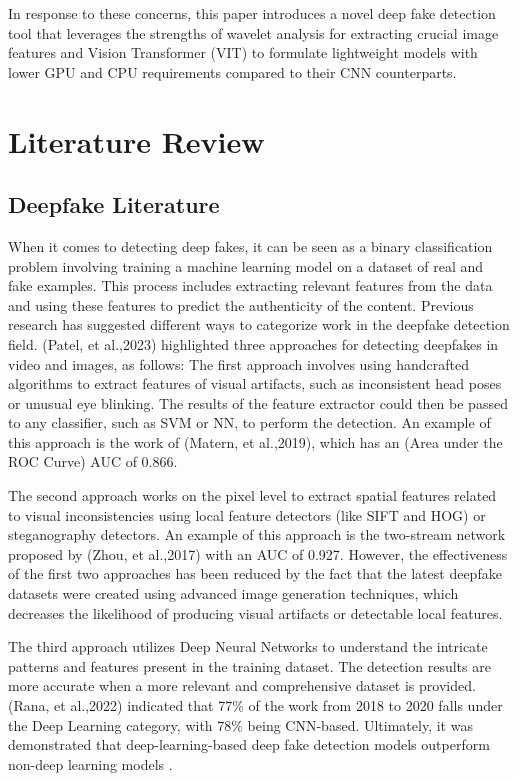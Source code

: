\documentclass{svproc}
\begin{document}
In response to these concerns, this paper introduces a novel deep fake detection tool that leverages the strengths of wavelet analysis for extracting crucial image features and Vision Transformer (VIT) to formulate lightweight models with lower GPU and CPU requirements compared to their CNN counterparts.

\section{Literature Review}
\subsection{Deepfake Literature}
When it comes to detecting deep fakes, it can be seen as a binary classification problem involving training a machine learning model on a dataset of real and fake examples\cite {patel2023deepfake}. This process includes extracting relevant features from the data and using these features to predict the authenticity of the content. Previous research has suggested different ways to categorize work in the deepfake detection field. (Patel, et al.,2023)\cite {patel2023deepfake} highlighted three approaches for detecting deepfakes in video and images, as follows: The first approach involves using handcrafted algorithms to extract features of visual artifacts, such as inconsistent head poses or unusual eye blinking. The results of the feature extractor could then be passed to any classifier, such as SVM or NN, to perform the detection. An example of this approach is the work of (Matern, et al.,2019), which has an (Area under the ROC Curve) AUC of 0.866\cite {matern2019exploiting}.

The second approach works on the pixel level to extract spatial features related to visual inconsistencies using local feature detectors (like SIFT and HOG) or steganography detectors. An example of this approach is the two-stream network proposed by (Zhou, et al.,2017) with an AUC of 0.927\cite {zhou2017two}. However, the effectiveness of the first two approaches has been reduced by the fact that the latest deepfake datasets were created using advanced image generation techniques, which decreases the likelihood of producing visual artifacts or detectable local features.

The third approach utilizes Deep Neural Networks to understand the intricate patterns and features present in the training dataset. The detection results are more accurate when a more relevant and comprehensive dataset is provided. (Rana, et al.,2022) indicated that 77\% of the work from 2018 to 2020 falls under the Deep Learning category, with 78\% being CNN-based. Ultimately, it was demonstrated that deep-learning-based deep fake detection models outperform non-deep learning models \cite {rana2022deepfake}.
\end{document}
